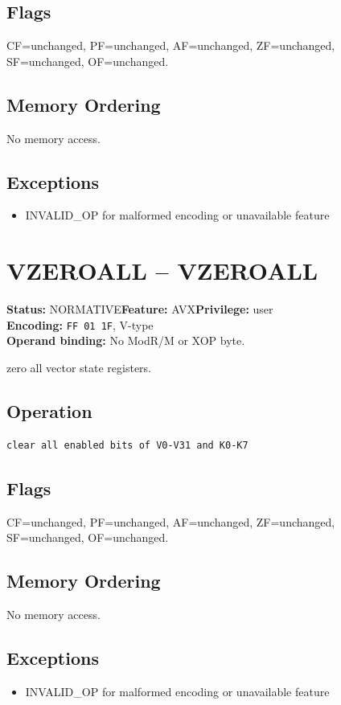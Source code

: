 \documentclass[10pt]{article}
\begin{document}
\subsection*{Flags}
CF=unchanged, PF=unchanged, AF=unchanged, ZF=unchanged, SF=unchanged, OF=unchanged.
\subsection*{Memory Ordering}
No memory access.
\subsection*{Exceptions}
\begin{itemize}
\item INVALID\_OP for malformed encoding or unavailable feature
\end{itemize}
\clearpage

\section{VZEROALL -- VZEROALL}
\textbf{Status:} NORMATIVE\quad \textbf{Feature:} AVX\quad \textbf{Privilege:} user\\
\textbf{Encoding:} \texttt{FF 01 1F}, V-type\\
\textbf{Operand binding:} No ModR/M or XOP byte.

zero all vector state registers.

\subsection*{Operation}
\begin{lstlisting}
clear all enabled bits of V0-V31 and K0-K7
\end{lstlisting}
\subsection*{Flags}
CF=unchanged, PF=unchanged, AF=unchanged, ZF=unchanged, SF=unchanged, OF=unchanged.
\subsection*{Memory Ordering}
No memory access.
\subsection*{Exceptions}
\begin{itemize}
\item INVALID\_OP for malformed encoding or unavailable feature
\end{itemize}
\clearpage
\end{document}
